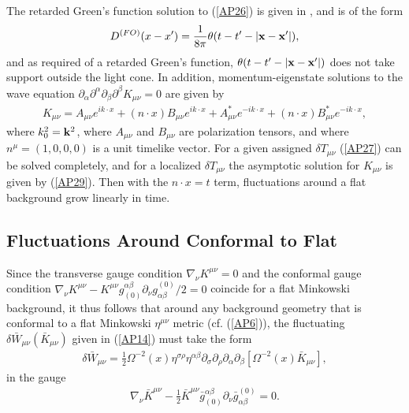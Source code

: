 \documentclass[aps]{revtex4}
\begin{document}
The retarded Green's function  solution to (\ref{AP26}) is given in \cite{Mannheim2007}, and is of the form
%
\begin{eqnarray}
D^{(FO)}(x-x^{\prime})=\frac{1}{8\pi}\theta (t-t^{\prime}-|{\bf x}-{\bf x}^{\prime}|),
\label{AP28}
\end{eqnarray}
%
and as required of a retarded Green's function, $\theta (t-t^{\prime}-|{\bf x}-{\bf x}^{\prime}|)$ does not take support outside the light cone. In addition, momentum-eigenstate solutions to the wave equation $\partial_{\alpha}\partial^{\alpha} \partial_{\beta}\partial^{\beta}K_{\mu \nu}=0$ are given by \cite{Riegert1984a,Mannheim2012b}
%
\begin{eqnarray}
K_{\mu\nu}=A_{\mu\nu}e^{ik\cdot x}+(n\cdot x)B_{\mu\nu}e^{ik\cdot x}+A^*_{\mu\nu}e^{-ik\cdot x}+(n\cdot x)B^*_{\mu\nu}e^{-ik\cdot x},
\label{AP29}
\end{eqnarray}
%
where $k_0^2={\bf k}^2$, where $A_{\mu\nu}$ and $B_{\mu\nu}$ are polarization tensors, and where $n^{\mu}=(1,0,0,0)$ is a unit timelike vector. For a given assigned $\delta T_{\mu\nu}$ (\ref{AP27}) can be solved completely, and for a localized $\delta T_{\mu\nu}$ the asymptotic solution for $K_{\mu\nu}$ is given by (\ref{AP29}). Then with the $n\cdot x=t$ term, fluctuations around a flat background grow linearly in time.

\subsection{Fluctuations Around Conformal to Flat}

Since  the transverse gauge condition $\nabla_{\nu}K^{\mu\nu}=0$ and the conformal gauge condition $\nabla_{\nu} K^{\mu\nu}- K^{\mu\nu}g_{(0)}^{\alpha\beta}\partial_{\nu}g^{(0)}_{\alpha\beta}/2=0$ coincide for a flat Minkowski background, it thus follows that around any background  geometry that is conformal to a flat Minkowski $\eta^{\mu\nu}$ metric  (cf. (\ref{AP6})), the fluctuating $\delta\bar{W}_{\mu\nu}(\bar{K}_{\mu\nu})$ given in (\ref{AP14}) must take the form 
%
\begin{eqnarray}
\delta \bar{W}_{\mu\nu}=\frac{1}{2}\Omega^{-2}(x)\eta^{\sigma\rho}\eta^{\alpha\beta}\partial_{\sigma}\partial_{\rho} \partial_{\alpha}\partial_{\beta}[\Omega^{-2}(x)\bar{K}_{\mu \nu}],
\label{AP30}
\end{eqnarray}
%
in the gauge
%
\begin{eqnarray}
\nabla_{\nu}\bar{K}^{\mu\nu}- \frac{1}{2}\bar{K}^{\mu\nu}\bar{g}_{(0)}^{\alpha\beta}\partial_{\nu}\bar{g}^{(0)}_{\alpha\beta}=0.
\label{AP31}
\end{eqnarray}
%
\end{document}
